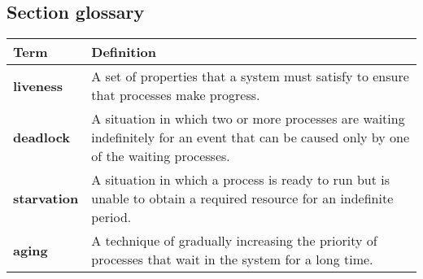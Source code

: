\subsection*{Section glossary}
\centering
\begin{tabular}{>{\raggedright}p{} >{\raggedright\arraybackslash}p{}}
\toprule
\textbf{Term} & \textbf{Definition} \\
\midrule
\textbf{liveness} & A set of properties that a system must satisfy to ensure that processes make progress. \\
\textbf{deadlock} & A situation in which two or more processes are waiting indefinitely for an event that can be caused only by one of the waiting processes. \\
\textbf{starvation} & A situation in which a process is ready to run but is unable to obtain a required resource for an indefinite period. \\
\textbf{aging} & A technique of gradually increasing the priority of processes that wait in the system for a long time. \\
\bottomrule
\end{tabular}
\vspace{\baselineskip}
